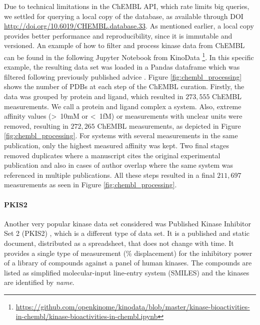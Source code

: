 \documentclass[9pt,lessons]{livecoms}
\begin{document}
Due to technical limitations in the ChEMBL API, which rate limits big queries, we settled for querying a local copy of the database, as available through DOI \url{http://doi.org/10.6019/CHEMBL.database.33}. 
As mentioned earlier, a local copy provides better performance and reproducibility, since it is immutable and versioned. 
An example of how to filter and process kinase data from ChEMBL can be found in the following Jupyter Notebook from KinoData \footnote{\url{https://github.com/openkinome/kinodata/blob/master/kinase-bioactivities-in-chembl/kinase-bioactivities-in-chembl.ipynb}}.  In this specific example, the resulting data set was loaded in a Pandas dataframe which was filtered following previously published advice \cite{Kalliokoski2013, Kramer2012}. 
Figure \ref{fig:chembl_processing} shows the number of PDBs at each step of the ChEMBL curation. Firstly, the data was grouped by protein and ligand, which resulted in $273,555$ ChEMBL measurements. We call a protein and ligand complex a system. %
Also, extreme affinity values (\textgreater\ 10mM or \textless\ 1fM) or measurements with unclear units were removed, resulting in $272,265$ ChEMBL measurements, as depicted in Figure \ref{fig:chembl_processing}. For systems with several measurements in the same publication, only the highest measured affinity was kept. Two final stages removed duplicates where a manuscript cites the original experimental publication and also in cases of author overlap where the same system was referenced in multiple publications. All these steps resulted in a final $211,697$ measurements as seen in Figure \ref{fig:chembl_processing}. 


\paragraph{PKIS2}

Another very popular kinase data set considered was Published Kinase Inhibitor Set 2 (PKIS2) \cite{drewry2017progress}, which is a different type of data set. 
It is a published and static document, distributed as a spreadsheet, that does not change with time. It provides a single type of measurement (\% displacement) for the inhibitory power of a library of compounds against a panel of human kinases. The compounds are listed as simplified molecular-input line-entry system (SMILES) and the kinases are identified by \emph{name}. 
\end{document}
